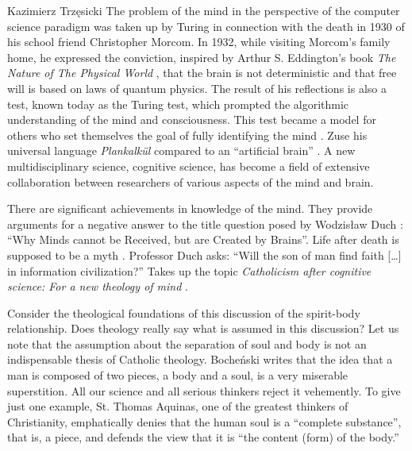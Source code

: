 \begin{artengenv}{Kazimierz Trzęsicki}
The problem of the mind in the perspective of the computer science paradigm was taken up by Turing in connection with the death in 1930 of his school friend Christopher Morcom. In 1932, while visiting Morcom's family home, he expressed the conviction, inspired by Arthur S. Eddington's book \emph{The Nature of The Physical World} \parencite*{Eddington2014}, that the brain is not deterministic and that free will is based on laws of quantum physics. The result of his reflections is also a test, known today as the Turing test, which prompted the algorithmic understanding of the mind and consciousness. This test became a model for others who set themselves the goal of fully identifying the mind \parencite{Krajewski2012}. Zuse his universal language \textit{Plankalk{\"u}l} compared to an ``artificial brain'' \parencite[p.62]{German2012}. A new multidisciplinary science, cognitive science, has become a field of extensive collaboration between researchers of various aspects of the mind and brain.


There are significant achievements in knowledge of the mind. They provide arguments for a negative answer to the title question posed by Wodzisław Duch \parencite*{duch_why_2017}
: ``Why Minds cannot be Received, but are Created by Brains''. Life after death is supposed to be a  myth \parencite{MartinAugustine2015}. Professor Duch asks: ``Will the son of man find faith [\ldots] in information civilization?'' Takes up the topic \emph{Catholicism after cognitive science: For a new theology of mind} \parencites{duch_katolicyzm_2015}[see also][]{slomka_neuronauki_2012}.

Consider the theological foundations of this discussion of the spirit-body relationship. Does theology really say what is assumed in this discussion? Let us note that the assumption about the separation of soul and body is not an indispensable thesis of Catholic theology. Bocheński \parencite*{Bochenski1994} writes   that the idea that a man is composed of two pieces, a body and a soul, is a very miserable superstition.   All our science and all serious thinkers reject it vehemently. To give just one example, St. Thomas Aquinas, one of the greatest thinkers of Christianity, emphatically denies that the human soul is a ``complete substance'', that is, a piece, and defends the view that it is ``the content (form) of the body.''


\end{artengenv}
